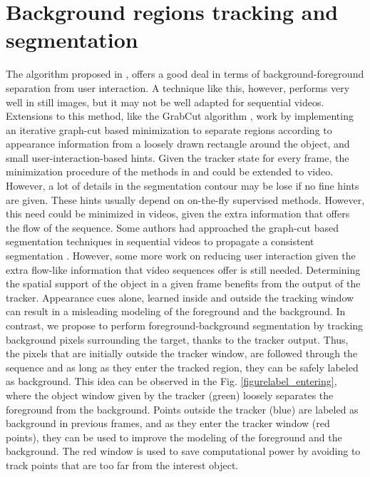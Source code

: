 
\section{Background regions tracking and segmentation}
\label{sec:segm}
The algorithm proposed in \cite{c18}, offers a good deal in terms of
background-foreground separation from user interaction. A technique like this, however,
performs very well in still images, but it may not be well adapted for sequential videos. 
Extensions to this method, like the GrabCut algorithm \cite{c14}, work by implementing an iterative graph-cut based 
minimization to separate regions according to appearance information from a loosely drawn rectangle around the object, and small user-interaction-based hints. 
Given the tracker state for every frame, the minimization procedure of the methods in \cite{c18} and \cite{c14} could be extended to video. However, 
a lot of details in the segmentation contour may be lose if no fine hints are given.
These hints usually depend on on-the-fly supervised methods. However, this need could be minimized in videos, given the extra information that offers the flow of the sequence.
Some authors had approached the graph-cut based segmentation techniques in sequential
videos to propagate a consistent segmentation \cite{c15}. However, some more work on reducing user interaction given the extra flow-like information
that video sequences offer is still needed.
Determining the spatial support of the object in a given frame benefits from the output of the tracker. Appearance cues alone, learned inside and outside the tracking window 
can result in a misleading modeling of the foreground and the background. In contrast, we propose to perform foreground-background segmentation by tracking 
background pixels surrounding the target, thanks to the tracker output. Thus, the pixels that are initially outside the tracker window, 
are followed through the sequence and as long as they enter the tracked region, they can be safely labeled as background. 
This idea can be observed in the Fig.  \ref{figurelabel_entering}, 
where the object window given by the tracker (green) loosely separates the foreground from the background. Points outside the tracker (blue) are labeled as background in previous frames, and as they enter the tracker window (red points), they can be used to improve the modeling  of the foreground and the background. 
The red window is used to save computational power by avoiding to track points that are too far from the interest object.


